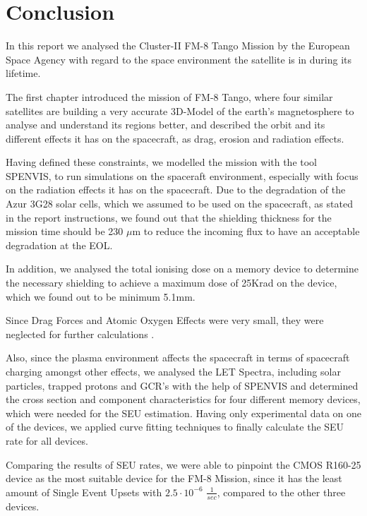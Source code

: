 \section{Conclusion}
In this report we analysed the Cluster-II FM-8 Tango Mission by the European Space Agency with regard to the space environment the satellite is in during its lifetime.

The first chapter introduced the mission of FM-8 Tango, where four similar satellites are building a very accurate 3D-Model of the earth's magnetosphere to analyse and understand its regions better, and described the orbit and its different effects it has on the spacecraft, as drag, erosion and radiation effects.

Having defined these constraints, we modelled the mission with the tool SPENVIS, to run simulations on the spaceraft environment, especially with focus on the radiation effects it has on the spacecraft.
Due to the degradation of the Azur 3G28 solar cells, which we assumed to be used on the spacecraft, as stated in the report instructions, we found out that the shielding thickness for the mission time should be 230 $\mu$m to reduce the incoming flux to have an acceptable degradation at the EOL.

In addition, we analysed the total ionising dose on a memory device to determine the necessary shielding to achieve a maximum dose of 25Krad on the device, which we found out to be minimum 5.1mm.

Since Drag Forces and Atomic Oxygen Effects were very small, they were neglected for further calculations \citep{vallado2008}.

Also, since the plasma environment affects the spacecraft in terms of spacecraft charging amongst other effects, we analysed the LET Spectra, including solar particles, trapped protons and GCR's with the help of SPENVIS and determined the cross section and component characteristics for four different memory devices, which were needed for the SEU estimation.
Having only experimental data on one of the devices, we applied curve fitting techniques to finally calculate the SEU rate for all devices.

Comparing the results of SEU rates, we were able to pinpoint the CMOS R160-25 device as the most suitable device for the FM-8 Mission, since it has the least amount of Single Event Upsets with $2.5 \cdot 10^{-6}$  \( \frac{1}{sec} \), compared to the other three devices.
